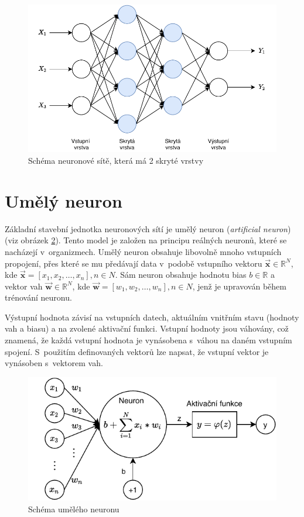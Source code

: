 \begin{figure}[H]
    \centering
    \includegraphics[scale=1.0]{obrazky-figures/mlp.pdf}
    \caption{\label{fig:mlp}Schéma neuronové sítě, která má 2 skryté vrstvy}
\end{figure}


\section{Umělý neuron}
Základní stavební jednotka neuronových sítí je umělý neuron (\textit{artificial neuron}) (viz obrázek \ref{fig:neuron}). Tento model je založen na principu reálných neuronů, které se nacházejí v~organizmech. Umělý neuron obsahuje libovolně mnoho vstupních propojení, přes které se mu předávají data v~podobě vstupního vektoru $\boldsymbol{\overrightarrow{x}} \in \mathbb{R}^N$, kde $\boldsymbol{\overrightarrow{x}} = [x_1, x_2, \dots, x_n], n \in N$. Sám neuron obsahuje hodnotu bias $b \in \mathbb{R}$ a vektor vah $\boldsymbol{\overrightarrow{w}} \in \mathbb{R}^N$, kde $\boldsymbol{\overrightarrow{w}} = [w_1, w_2, \dots, w_n], n \in N$, jenž je upravován během trénování neuronu.

Výstupní hodnota závisí na vstupních datech, aktuálním vnitřním stavu (hodnoty vah a biasu) a na zvolené aktivační funkci. Vstupní hodnoty jsou váhovány, což znamená, že každá vstupní hodnota je vynásobena s~váhou na daném vstupním spojení. S~použitím definovaných vektorů lze napsat, že vstupní vektor je vynásoben s~vektorem vah.

\begin{figure}[H]
    \centering
    \includegraphics[scale=1.0]{obrazky-figures/perceptron.pdf}
    \caption{\label{fig:neuron}Schéma umělého neuronu}
\end{figure}

